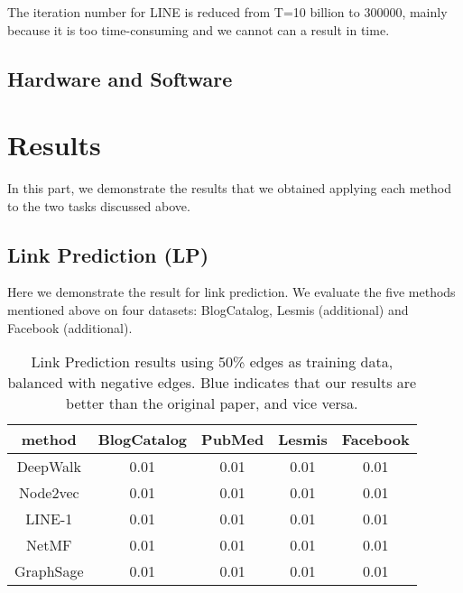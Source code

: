 \documentclass[a4paper]{article}
\begin{document}
The iteration number for LINE is reduced from T=10 billion to 300000, mainly because it is too time-consuming and we cannot can a result in time.

\subsection{Hardware and Software}

\section{Results}

\noindent In this part, we demonstrate the results that we obtained applying each method to the two tasks discussed above. 


%

\subsection{Link Prediction (LP)}


\noindent Here we demonstrate the result for link prediction. We evaluate the five methods mentioned above on four datasets: BlogCatalog, Lesmis (additional) and Facebook (additional).

\begin{table}[H]
\centering
\begin{tabular}{|c|c|c|c|c|}
\hline
method & BlogCatalog & PubMed & Lesmis & Facebook\\
\hline
DeepWalk& 0.01& 0.01& 0.01& 0.01\\
Node2vec& 0.01& 0.01& 0.01& 0.01\\
LINE-1& 0.01& 0.01& 0.01& 0.01\\
NetMF& 0.01& 0.01& 0.01& 0.01\\
GraphSage& 0.01& 0.01& 0.01& 0.01\\
\hline
\end{tabular}
\caption{Link Prediction results using 50\% edges as training data, balanced with negative edges. Blue indicates that our results are better than the original paper, and vice versa.}
\end{table}
\end{document}
